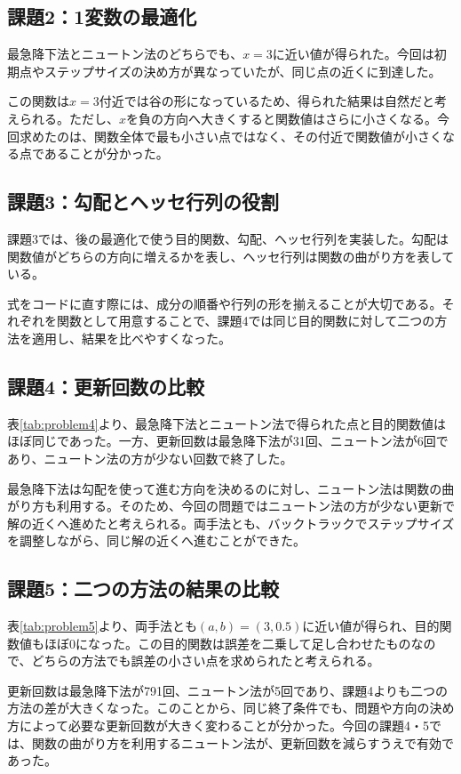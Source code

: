\documentclass[a4j]{jarticle}
\begin{document}
\subsection{課題2：1変数の最適化}
最急降下法とニュートン法のどちらでも、$x=3$に近い値が得られた。今回は初期点やステップサイズの決め方が異なっていたが、同じ点の近くに到達した。

この関数は$x=3$付近では谷の形になっているため、得られた結果は自然だと考えられる。ただし、$x$を負の方向へ大きくすると関数値はさらに小さくなる。今回求めたのは、関数全体で最も小さい点ではなく、その付近で関数値が小さくなる点であることが分かった。

\subsection{課題3：勾配とヘッセ行列の役割}
課題3では、後の最適化で使う目的関数、勾配、ヘッセ行列を実装した。勾配は関数値がどちらの方向に増えるかを表し、ヘッセ行列は関数の曲がり方を表している。

式をコードに直す際には、成分の順番や行列の形を揃えることが大切である。それぞれを関数として用意することで、課題4では同じ目的関数に対して二つの方法を適用し、結果を比べやすくなった。

\subsection{課題4：更新回数の比較}
表\ref{tab:problem4}より、最急降下法とニュートン法で得られた点と目的関数値はほぼ同じであった。一方、更新回数は最急降下法が31回、ニュートン法が6回であり、ニュートン法の方が少ない回数で終了した。

最急降下法は勾配を使って進む方向を決めるのに対し、ニュートン法は関数の曲がり方も利用する。そのため、今回の問題ではニュートン法の方が少ない更新で解の近くへ進めたと考えられる。両手法とも、バックトラックでステップサイズを調整しながら、同じ解の近くへ進むことができた。

\subsection{課題5：二つの方法の結果の比較}
表\ref{tab:problem5}より、両手法とも$(a,b)=(3,0.5)$に近い値が得られ、目的関数値もほぼ0になった。この目的関数は誤差を二乗して足し合わせたものなので、どちらの方法でも誤差の小さい点を求められたと考えられる。

更新回数は最急降下法が791回、ニュートン法が5回であり、課題4よりも二つの方法の差が大きくなった。このことから、同じ終了条件でも、問題や方向の決め方によって必要な更新回数が大きく変わることが分かった。今回の課題4・5では、関数の曲がり方を利用するニュートン法が、更新回数を減らすうえで有効であった。
\end{document}
